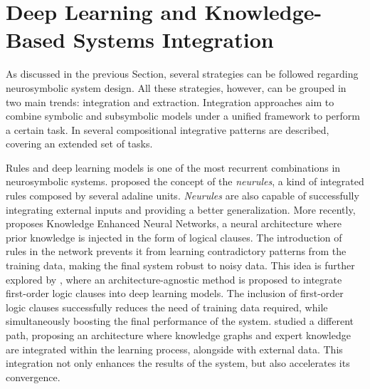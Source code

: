 \section{Deep Learning and Knowledge-Based Systems Integration} \label{sec:dl_kb_intregration_rw}

As discussed in the previous Section, several strategies can be followed regarding neurosymbolic system design. All these strategies, however, can be grouped in two main trends: integration and extraction. Integration approaches aim to combine symbolic and subsymbolic models under a unified framework to perform a certain task. In \cite{van_bekkum_modular_2021} several compositional integrative patterns are described, covering an extended set of tasks. 

Rules and deep learning models is one of the most recurrent combinations in neurosymbolic systems. \cite{hatzilygeroudis_integrated_2010} proposed the concept of the \textit{neurules}, a kind of integrated rules composed by several adaline units. \textit{Neurules} are also capable of successfully integrating external inputs and providing a better generalization. More recently, \cite{daniele_knowledge_2019} proposes Knowledge Enhanced Neural Networks, a neural architecture where prior knowledge is injected in the form of logical clauses. The introduction of rules in the network prevents it from learning contradictory patterns from the training data, making the final system robust to noisy data. This idea is further explored by \cite{roychowdhury_regularizing_2021}, where an architecture-agnostic method is proposed to integrate first-order logic clauses into deep learning models. The inclusion of first-order logic clauses successfully reduces the need of training data required, while simultaneously boosting the final performance of the system. \cite{kursuncu_knowledge_2020} studied a different path, proposing an architecture where knowledge graphs and expert knowledge are integrated within the learning process, alongside with external data. This integration not only enhances the results of the system, but also accelerates its convergence.

